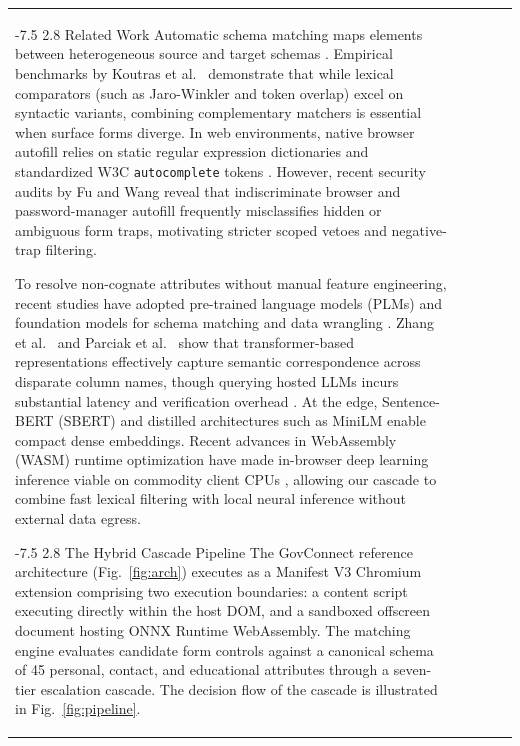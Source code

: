 \documentclass[runningheads,a4paper]{llncs}
\makeatletter
\renewcommand\section{\@startsection{section}{1}{\z@}%
  {-7.5\p@ \@plus -2\p@ \@minus -1\p@}%
  {2.8\p@ \@plus 1\p@}%
  {\normalfont\large\bfseries}}
\makeatother
\begin{document}
\begin{table}[t]
\begin{tabular}{p{3.2cm}cccc}
\section{Related Work}
\noindent Automatic schema matching maps elements between heterogeneous source and target schemas \cite{rahm2001,koutras2021}. Empirical benchmarks by Koutras et al.\ \cite{koutras2021} demonstrate that while lexical comparators (such as Jaro-Winkler and token overlap) excel on syntactic variants, combining complementary matchers is essential when surface forms diverge. In web environments, native browser autofill relies on static regular expression dictionaries and standardized W3C \texttt{autocomplete} tokens \cite{whatwg2026,chromium2024}. However, recent security audits by Fu and Wang \cite{fu2024} reveal that indiscriminate browser and password-manager autofill frequently misclassifies hidden or ambiguous form traps, motivating stricter scoped vetoes and negative-trap filtering.

To resolve non-cognate attributes without manual feature engineering, recent studies have adopted pre-trained language models (PLMs) and foundation models for schema matching and data wrangling \cite{zhang2023,parciak2024,narayan2022}. Zhang et al.\ \cite{zhang2023} and Parciak et al.\ \cite{parciak2024} show that transformer-based representations effectively capture semantic correspondence across disparate column names, though querying hosted LLMs incurs substantial latency and verification overhead \cite{parciak2024,narayan2022}. At the edge, Sentence-BERT (SBERT) \cite{reimers2019} and distilled architectures such as MiniLM \cite{wang2020} enable compact dense embeddings. Recent advances in WebAssembly (WASM) runtime optimization have made in-browser deep learning inference viable on commodity client CPUs \cite{jia2024}, allowing our cascade to combine fast lexical filtering with local neural inference without external data egress.

\section{The Hybrid Cascade Pipeline}
\noindent The GovConnect reference architecture (Fig.~\ref{fig:arch}) executes as a Manifest V3 Chromium extension comprising two execution boundaries: a content script executing directly within the host DOM, and a sandboxed offscreen document hosting ONNX Runtime WebAssembly. The matching engine evaluates candidate form controls against a canonical schema of 45 personal, contact, and educational attributes through a seven-tier escalation cascade. The decision flow of the cascade is illustrated in Fig.~\ref{fig:pipeline}.


\end{tabular}
\end{table}
\end{document}
